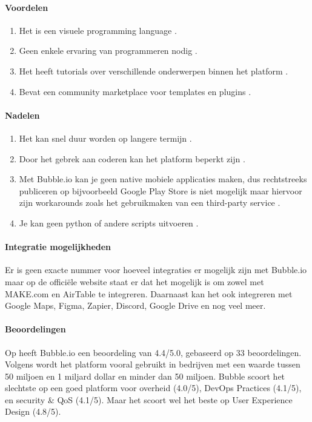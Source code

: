 \paragraph*{Voordelen}
\begin{enumerate}
    \item Het is een visuele programming language \autocite{Minor2022}.
    \item Geen enkele ervaring van programmeren nodig \autocite{Minor2022}.
    \item Het heeft tutorials over verschillende onderwerpen binnen het platform \autocite{Minor2022}.
    \item Bevat een community marketplace voor templates en plugins \autocite{Minor2022}.
\end{enumerate}


\paragraph*{Nadelen}
\begin{enumerate}
    \item Het kan snel duur worden op langere termijn \autocite{Minor2022}.
    \item Door het gebrek aan coderen kan het platform beperkt zijn \autocite{Minor2022}.
    \item Met Bubble.io kan je geen native mobiele applicaties maken, dus rechtstreeks publiceren op bijvoorbeeld Google Play Store is niet mogelijk
    maar hiervoor zijn workarounds zoals het gebruikmaken van een third-party service \autocite{Sharma2022}.
    \item Je kan geen python of andere scripts uitvoeren \autocite{Sharma2022}.
\end{enumerate}

\paragraph{Integratie mogelijkheden}
Er is geen exacte nummer voor hoeveel integraties er mogelijk zijn met Bubble.io maar op de officiële website \textcite{Bubble2024a} 
staat er dat het mogelijk is om zowel met MAKE.com en AirTable te integreren. Daarnaast kan het ook integreren met Google Maps, Figma, Zapier, Discord, Google Drive en nog veel meer.

\paragraph{Beoordelingen}
Op \textcite{Gartner2024} heeft Bubble.io een beoordeling van 4.4/5.0, gebaseerd op 33 beoordelingen. Volgens \textcite{Gartner2024}
wordt het platform vooral gebruikt in bedrijven met een waarde tussen 50 miljoen en 1 miljard dollar en minder dan 50 miljoen.
Bubble scoort het slechtste op een goed platform voor overheid (4.0/5), DevOps Practices (4.1/5), en security \& QoS  (4.1/5). Maar het scoort wel
het beste op User Experience Design (4.8/5).

